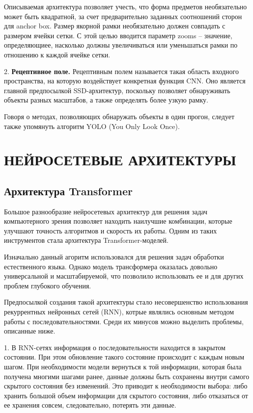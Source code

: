 \documentclass[14pt,a4paper]{extarticle}
\begin{document}
Описываемая архитектура позволяет учесть, что форма предметов необязательно может быть квадратной, за счет предварительно заданных соотношений сторон для anchor box. Размер якорной рамки необязательно должен совпадать с размером ячейки сетки. С этой целью вводится параметр zooms -- значение, определяющиее, насколько должны увеличиваться или уменьшаться рамки по отношению к каждой ячейке сетки. 

2. \textbf{Рецептивное поле.} Рецептивным полем называется такая область входного пространства, на которую воздействует конкретная функция CNN. Оно является главной предпосылкой SSD-архитектур, поскольку позволяет обнаруживать объекты разных масштабов, а также определять более узкую рамку. 

Говоря о методах, позволяющих обнаружать объекты в один прогон, следует также упомянуть алгоритм YOLO (You Only Look Once). 

\newpage


\section{НЕЙРОСЕТЕВЫЕ АРХИТЕКТУРЫ}
\subsection{Архитектура Transformer}
Большое разнообразие нейросетевых архитектур для решения задач компьютерного зрения позволяет находить наилучшие комбинации, которые улучшают точность алгоритмов и скорость их работы. Одним из таких инструментов стала архитектура Transformer-моделей. 

Изначально данный агоритм использовался для решения задач обработки естественного языка. Однако модель трансформера оказалась довольно универсальной и масштабируемой, что позволило использовать ее и для других проблем глубокого обучения.

Предпосылкой создания такой архитектуры стало несовершенство использования рекуррентных нейронных сетей (RNN), котрые являлись основным методом работы с последовательностями. Среди их минусов можно выделить проблемы, описанные ниже.

1. В RNN-сетях информация о последовательности находится в закрытом состоянии. При этом обновление такого состояние происходит с каждым новым шагом. При необходимости модели вернуться к той информации, которая была получена многими шагами ранее, данные должны быть сохранены внутри самого скрытого состояния без изменений. Это приводит к необходимости выбора: либо хранить большой объем информации для скрытого состояния, либо отказаться от ее хранения совсем, следовательно, потерять эти данные.
\end{document}
